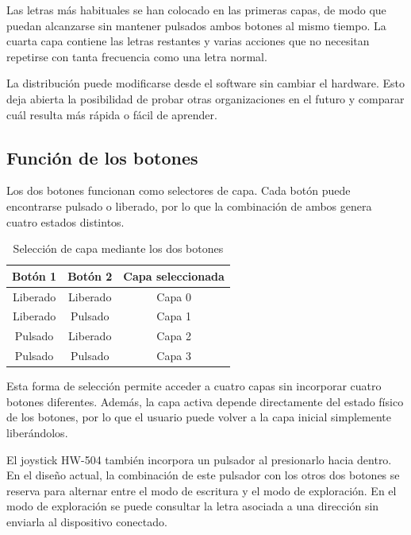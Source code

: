 Las letras más habituales se han colocado en las primeras capas, de modo que puedan alcanzarse sin mantener pulsados ambos botones al mismo tiempo. La cuarta capa contiene las letras restantes y varias acciones que no necesitan repetirse con tanta frecuencia como una letra normal.

La distribución puede modificarse desde el software sin cambiar el hardware. Esto deja abierta la posibilidad de probar otras organizaciones en el futuro y comparar cuál resulta más rápida o fácil de aprender.

\subsection{Función de los botones}
\label{subsec:funcion-botones}

Los dos botones funcionan como selectores de capa. Cada botón puede encontrarse pulsado o liberado, por lo que la combinación de ambos genera cuatro estados distintos.

\begin{table}[ht]
    \centering
    \caption{Selección de capa mediante los dos botones}
    \label{tab:seleccion-capas}
    \begin{tabular}{ccc}
        \toprule
        \textbf{Botón 1} & \textbf{Botón 2} & \textbf{Capa seleccionada} \\
        \midrule
        Liberado & Liberado & Capa 0 \\
        Liberado & Pulsado  & Capa 1 \\
        Pulsado  & Liberado & Capa 2 \\
        Pulsado  & Pulsado  & Capa 3 \\
        \bottomrule
    \end{tabular}
\end{table}

Esta forma de selección permite acceder a cuatro capas sin incorporar cuatro botones diferentes. Además, la capa activa depende directamente del estado físico de los botones, por lo que el usuario puede volver a la capa inicial simplemente liberándolos.

El joystick HW-504 también incorpora un pulsador al presionarlo hacia dentro. En el diseño actual, la combinación de este pulsador con los otros dos botones se reserva para alternar entre el modo de escritura y el modo de exploración. En el modo de exploración se puede consultar la letra asociada a una dirección sin enviarla al dispositivo conectado.

